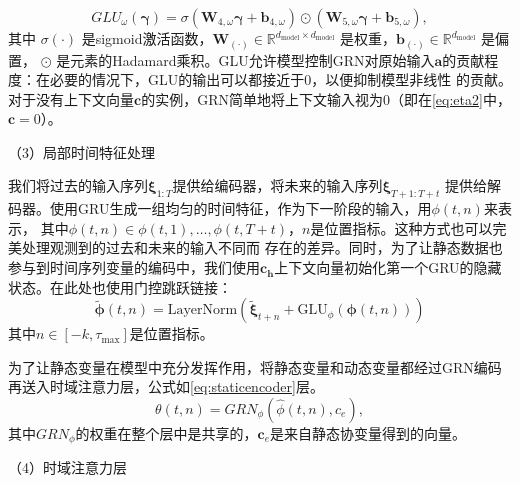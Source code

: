 \begin{equation}
    GLU_{\omega}(\boldsymbol{\gamma }) = \sigma(\mathbf{W}_{4,\omega} \mathbf{\boldsymbol{\gamma }} + \mathbf{b}_{4,\omega}) \odot (\mathbf{W}_{5,\omega} \mathbf{\boldsymbol{\gamma }} + \mathbf{b}_{5,\omega}),
\end{equation}
其中 $\sigma(\cdot)$ 是sigmoid激活函数，$\mathbf{W}_{(\cdot)} \in \mathbb{R}^{d_{\text{model}} \times d_{\text{model}}}$ 是权重，$\mathbf{b}_{(\cdot)} \in \mathbb{R}^{d_{\text{model}}}$ 是偏置，
$\odot $ 是元素的Hadamard乘积。GLU允许模型控制GRN对原始输入$\mathbf{a}$的贡献程度：在必要的情况下，GLU的输出可以都接近于0，以便抑制模型非线性
的贡献。对于没有上下文向量$\mathbf{c}$的实例，GRN简单地将上下文输入视为0（即在\eqref{eq:eta2}中，$\mathbf{c}=0$）。

（3）局部时间特征处理

我们将过去的输入序列$\bm{\xi}_{1:T}$提供给编码器，将未来的输入序列$\bm{\xi}_{T+1:T+t}$
提供给解码器。使用GRU生成一组均匀的时间特征，作为下一阶段的输入，用$\phi (t,n)$来表示，
其中$\phi(t,n) \in {\phi(t, 1), \ldots, \phi(t, T+t)}$，$n$是位置指标。这种方式也可以完美处理观测到的过去和未来的输入不同而
存在的差异。同时，为了让静态数据也参与到时间序列变量的编码中，我们使用$\mathbf{c_h}$上下文向量初始化第一个GRU的隐藏状态。在此处也使用门控跳跃链接：
\begin{equation}
    \tilde{\bm{\phi}}(t, n) = \text{LayerNorm}\left(\tilde{\bm{\xi}}_{t+n} + \text{GLU}_{\phi}(\bm{\phi}(t, n))\right)
\end{equation}
其中$n \in [ -k, \tau_{\max}]$是位置指标。

为了让静态变量在模型中充分发挥作用，将静态变量和动态变量都经过GRN编码再送入时域注意力层，公式如\eqref{eq:staticencoder}层。
\begin{equation}
    \theta(t, n) = GRN_{\phi}(\hat{\phi}(t, n), c_e),
    \label{eq:staticencoder}
\end{equation}
其中$GRN_{\phi}$的权重在整个层中是共享的，$\mathbf{c}_e$是来自静态协变量得到的向量。

（4）时域注意力层

